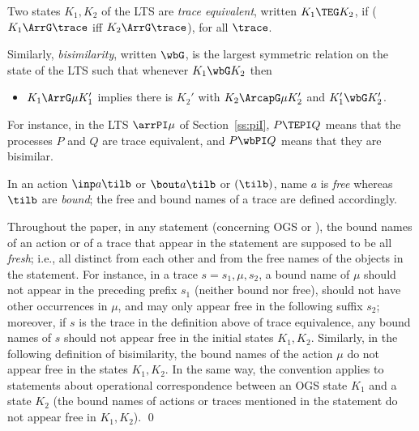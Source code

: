 Two states $K_1, K_2 $ of the LTS   are \emph{trace equivalent}, written 
 $K_1 \TEG K_2$, if    ($K_1 \ArrG \trace $  iff 
$K_2 \ArrG \trace  $), for all $\trace$. 
 
Similarly,  \emph{bisimilarity}, written $\wbG $,
 is the largest symmetric relation on the state of the LTS such that 
whenever $K_1 \wbG K_2$ then 
\begin{itemize}
\item $K_1 \ArrG \mu  K_1'$ implies there is $K_2'$ with 
$K_2 \ArcapG \mu  K_2'$ and $K'_1 \wbG K'_2$.
\end{itemize} 
For instance, in the \piI LTS   $\arrPI \mu $ of Section~\ref{ss:piI}, 
$P \TEPI Q$ means that the \piI  processes $P$ and $Q$ are trace equivalent, and 
$P \wbPI Q$ means that they are bisimilar.

\begin{remark}
\label{r:bn} 
In an action $\inp a \tilb$ or $\bout a \tilb$ or $(\tilb)$, 
name $a$ is \emph{free} whereas $\tilb$ are \emph{bound}; 
the free and bound names of a trace are defined accordingly.


Throughout the paper, 
in any statement (concerning OGS or \piI), the bound names of an action or of a trace that
appear in the statement are supposed to be all \emph{fresh}; i.e.,  
all distinct from each other and from the free names of the objects in the statement. 
For instance, in a  trace $s= s_1, \mu, s_2$, a  bound name of $\mu$ should not appear in the
preceding prefix  $s_1$
(neither bound nor free), should not have other occurrences  in $\mu$, 
and may only appear free in the following suffix  $s_2$; moreover, if  
$s$ is the trace 
in the definition above  of trace equivalence,  any  bound names  of
$s$ should not appear free in the initial states $K_1,K_2$.  
Similarly, in the following definition of bisimilarity, the bound names of the action $\mu$ do
not appear free in the states $K_1,K_2$. 
In the same way, the convention applies to statements about operational correspondence between an
OGS state $K_1$ and a \piI state $K_2$ (the bound names of actions or traces mentioned in
the statement do not appear free in  $K_1,K_2$).
\qed\end{remark}
